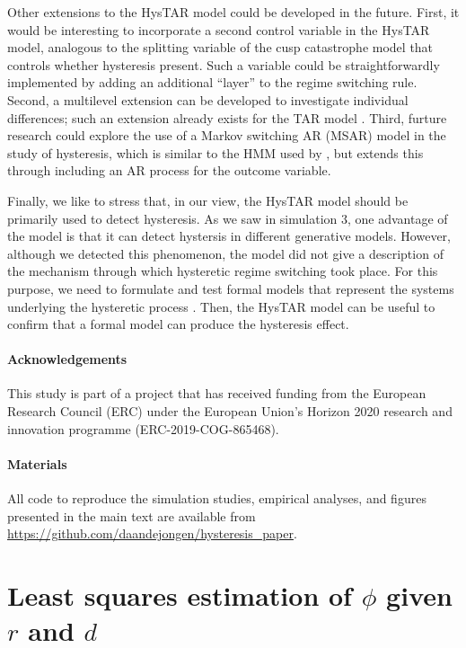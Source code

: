 \documentclass{article}
\begin{document}
Other extensions to the HysTAR model could be developed in the future.
First, it would be interesting to incorporate a second control variable in the HysTAR model, analogous to the splitting variable of the cusp catastrophe model that controls whether hysteresis present.
Such a variable could be straightforwardly implemented by adding an additional ``layer'' to the regime switching rule.
Second, a multilevel extension can be developed to investigate individual differences; such an extension already exists for the TAR model \citep{tar_affect_dyadic1}.
Third, furture research could explore the use of a Markov switching AR (MSAR) model in the study of hysteresis, which is similar to the HMM used by \citet{speedaccuracy}, but extends this through including an AR process for the outcome variable.

Finally, we like to stress that, in our view, the HysTAR model should be primarily used to detect hysteresis.
As we saw in simulation 3, one advantage of the model is that it can detect hystersis in different generative models. However, although we detected this phenomenon, the model did not give a description of the mechanism through which hysteretic regime switching took place. 
For this purpose, we need to formulate and test formal models that represent the systems underlying the hysteretic process \citep{formal_theory_3, formal_theory_1, formal_theory_2, formal_theory_4}. Then, the HysTAR model can be useful to confirm that a formal model can produce the hysteresis effect.

\paragraph{Acknowledgements}
This study is part of a project that has received funding from the European Research Council (ERC) under the European Union's Horizon 2020 research and innovation programme (ERC-2019-COG-865468).
\paragraph{Materials} All code to reproduce the simulation studies, empirical analyses, and figures presented in the main text are available from \url{https://github.com/daandejongen/hysteresis_paper}.




\appendix
 
\section{Least squares estimation of $\phi$ given $r$ and $d$}
\end{document}
